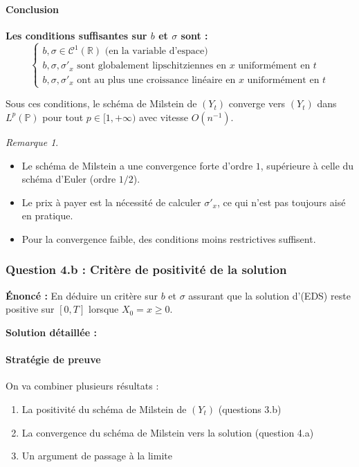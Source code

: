 \documentclass[12pt,a4paper]{article}
\theoremstyle{definition}
\theoremstyle{remark}
\newtheorem*{remark}{Remarque}
\newcommand{\R}{\mathbb{R}}
\newcommand{\Prob}{\mathbb{P}}
\begin{document}
\paragraph{Conclusion}

\textbf{Les conditions suffisantes sur $b$ et $\sigma$ sont :}
\begin{equation}
\boxed{
\begin{cases}
b, \sigma \in \mathcal{C}^1(\R) \text{ (en la variable d'espace)} \\
b, \sigma, \sigma'_x \text{ sont globalement lipschitziennes en } x \text{ uniformément en } t \\
b, \sigma, \sigma'_x \text{ ont au plus une croissance linéaire en } x \text{ uniformément en } t
\end{cases}
}
\end{equation}

Sous ces conditions, le schéma de Milstein de $(Y_t)$ converge vers $(Y_t)$ dans $L^p(\Prob)$ pour tout $p \in [1,+\infty)$ avec vitesse $O(n^{-1})$.

\begin{remark}
\begin{itemize}
\item Le schéma de Milstein a une convergence forte d'ordre $1$, supérieure à celle du schéma d'Euler (ordre $1/2$).
\item Le prix à payer est la nécessité de calculer $\sigma'_x$, ce qui n'est pas toujours aisé en pratique.
\item Pour la convergence faible, des conditions moins restrictives suffisent.
\end{itemize}
\end{remark}

\subsubsection{Question 4.b : Critère de positivité de la solution}

\textbf{Énoncé :} En déduire un critère sur $b$ et $\sigma$ assurant que la solution d'(EDS) reste positive sur $[0,T]$ lorsque $X_0 = x \geq 0$.

\textbf{Solution détaillée :}

\paragraph{Stratégie de preuve}

On va combiner plusieurs résultats :
\begin{enumerate}
\item La positivité du schéma de Milstein de $(Y_t)$ (questions 3.b)
\item La convergence du schéma de Milstein vers la solution (question 4.a)
\item Un argument de passage à la limite
\end{enumerate}
\end{document}
